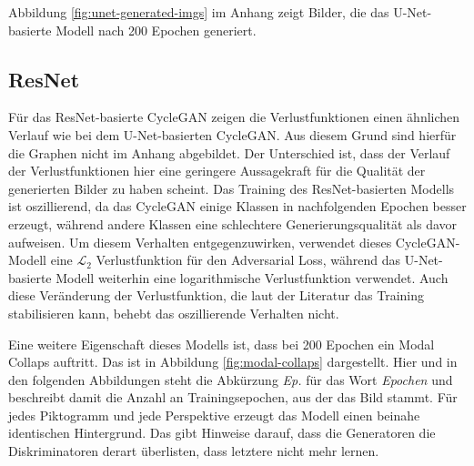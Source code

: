 Abbildung \ref{fig:unet-generated-imgs} im Anhang zeigt Bilder, die das U-Net-basierte Modell nach 200 Epochen generiert.


\subsection{ResNet}

Für das ResNet-basierte \ac{CycleGAN} zeigen die Verlustfunktionen einen ähnlichen Verlauf wie bei dem U-Net-basierten \ac{CycleGAN}. Aus diesem Grund sind hierfür die Graphen nicht im Anhang abgebildet. Der Unterschied ist, dass der Verlauf der Verlustfunktionen hier eine geringere Aussagekraft für die Qualität der generierten Bilder zu haben scheint. Das Training des ResNet-basierten Modells ist oszillierend, da das \ac{CycleGAN} einige Klassen in nachfolgenden Epochen besser erzeugt, während andere Klassen eine schlechtere Generierungsqualität als davor aufweisen. Um diesem Verhalten entgegenzuwirken, verwendet dieses \ac{CycleGAN}-Modell eine $\mathcal{L}_2$ Verlustfunktion für den Adversarial Loss, während das U-Net-basierte Modell weiterhin eine logarithmische Verlustfunktion verwendet. Auch diese Veränderung der Verlustfunktion, die laut der Literatur das Training stabilisieren kann, behebt das oszillierende Verhalten nicht.

Eine weitere Eigenschaft dieses Modells ist, dass bei 200 Epochen ein Modal Collaps auftritt. Das ist in Abbildung \ref{fig:modal-collaps} dargestellt. Hier und in den folgenden Abbildungen steht die Abkürzung \emph{Ep.} für das Wort \emph{Epochen} und beschreibt damit die Anzahl an Trainingsepochen, aus der das Bild stammt. Für jedes Piktogramm und jede Perspektive erzeugt das Modell einen beinahe identischen Hintergrund. Das gibt Hinweise darauf, dass die Generatoren die Diskriminatoren derart überlisten, dass letztere nicht mehr lernen.

